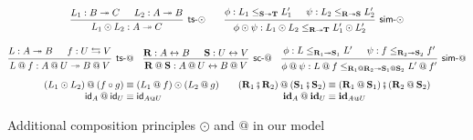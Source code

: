 \documentclass[acmsmall,screen,review,anonymous]{acmart}
\newcommand{\kw}[1]{\ensuremath{ \mathsf{#1} }}
\newcommand{\lensarrow}{\leftrightarrows}
\newcommand{\idsc}{\mathbf{id}} %
\newcommand{\vcomp}{\fatsemi}
\begin{document}
\begin{figure} %
  \small
  \begin{gather*}
    \begin{prooftree}
      \hypo{L_1 : B \twoheadrightarrow C}
      \hypo{L_2 : A \twoheadrightarrow B}
      \infer2[\kw{ts}-$\odot$]{L_1 \odot L_2 : A \twoheadrightarrow C}
    \end{prooftree}
    \qquad
    \begin{prooftree}
      \hypo{\phi: L_1 \le_{\mathbf{S} \twoheadrightarrow \mathbf{T}} L_1'}
      \hypo{\psi: L_2 \le_{\mathbf{R} \twoheadrightarrow \mathbf{S}} L_2'}
      \infer2[\kw{sim}-$\odot$]{\phi \odot \psi :
	L_1 \odot L_2 \le_{\mathbf{R} \twoheadrightarrow \mathbf{T}} L_1' \odot L_2'}
    \end{prooftree}
    \\[1em]
    \begin{prooftree}
      \hypo{L : A \twoheadrightarrow B}
      \hypo{f : U \lensarrow V}
      \infer2[\kw{ts}-$\mathbin@$]{
        L \mathbin@ f : A \mathbin@ U \twoheadrightarrow B \mathbin@ V
      }
    \end{prooftree}
    \quad
    \begin{prooftree}
      \hypo{\mathbf{R} : A \leftrightarrow B}
      \hypo{\mathbf{S} : U \leftrightarrow V}
      \infer2[\kw{sc}-$\mathbin@$]{
        \mathbf{R} \mathbin@ \mathbf{S} : A \mathbin@ U \leftrightarrow B \mathbin@ V
      }
    \end{prooftree}
    \quad
    \begin{prooftree}
      \hypo{\phi: L \le_{\mathbf{R}_1 \twoheadrightarrow \mathbf{S}_1} L'}
      \hypo{\psi: f \le_{\mathbf{R}_2 \twoheadrightarrow \mathbf{S}_2} f'}
      \infer2[\kw{sim}-$\mathbin@$]{\phi \mathbin@ \psi :
	L \mathbin@ f
        \le_{\mathbf{R}_1 \mathbin@ \mathbf{R}_2 \twoheadrightarrow
             \mathbf{S}_1 \mathbin@ \mathbf{S}_2}
	L' \mathbin@ f'}
    \end{prooftree}
    \\[1ex]
    \begin{array}{r@{}l}
      (L_1 \odot L_2) \mathbin@ (f \circ g) & {} \equiv
      (L_1 \mathbin@ f) \odot (L_2 \mathbin@ g) \\
      \kw{id}_A \mathbin@ \kw{id}_U & {} \equiv \kw{id}_{A \mathbin@ U}
    \end{array}
    \quad
    \begin{array}{r@{}l}
      (\mathbf{R}_1 \vcomp \mathbf{R}_2) \mathbin@ (\mathbf{S}_1 \vcomp \mathbf{S}_2)
      & {} \equiv
      (\mathbf{R}_1 \mathbin@ \mathbf{S}_1) \vcomp (\mathbf{R}_2 \mathbin@ \mathbf{S}_2)
      \\
      \idsc_A \mathbin@ \idsc_U & {} \equiv \idsc_{A \mathbin@ U}
    \end{array}
  \end{gather*}
  \caption{Additional composition principles $\odot$ and $\mathbin@$ in our model}
  \label{fig:xcomp}
\end{figure}
\end{document}
